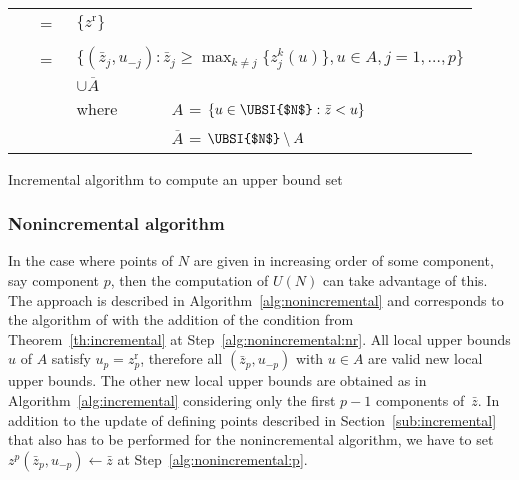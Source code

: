 \documentclass[a4paper,11pt]{article}
\newcommand{\bz}{\bar{z}}
\newcommand{\BM}{z^{\text{r}}}
\begin{document}
\begin{algorithm}
  \begin{tabular}{llll}
    \nl\UBSI{$\emptyset$}~      & =~ & \multicolumn{2}{l}{$\{\BM\}$\nllabel{alg:incremental:init}\;}\\
    &&&\\[-8pt]
    \nl\UBSI{$N\cup \{\bz\}$}~  & =~ & \multicolumn{2}{l}{$\{(\bz_j, u_{-j}) : \bz_j \geq \max_{k\neq j} \{z_j^{k}(u)\}, u\in A, j=1, \dots, p\}$\;}\nllabel{alg:incremental:nr}\\
    \nl                         &    &  $\cup \overline{A}$ &\;\\
    \nl                         &    & where~ & $A$ = $\{u\in \text{\UBSI{$N$}}: \bz<u\}$\nllabel{alg:incremental:A}\;\\
    \nl                         &    &        & $\overline{A}$ = $\text{\UBSI{$N$}}\setminus A$\;
  \end{tabular}
  \caption{Incremental algorithm to compute an upper bound set\label{alg:incremental}}
\end{algorithm}





\subsubsection{Nonincremental algorithm}\label{sub:nonincremental}

In the case where points of $N$ are given in increasing order of some component,
say component $p$, then the computation of $U(N)$ can take advantage of this.
The approach is described in Algorithm~\ref{alg:nonincremental} and corresponds to
the algorithm of \cite[Section 3.1]{KapRubShaVer08} 
with the addition of the condition from Theorem~\ref{th:incremental} at Step~\ref{alg:nonincremental:nr}.
All local upper bounds $u$ of $A$ satisfy $u_p=\BM_p$, 
therefore all $(\bz_p, u_{-p})$ with $u \in A$ are valid new local upper bounds. 
The other new local upper bounds are obtained as in Algorithm~\ref{alg:incremental}
considering only the first $p-1$ components of~$\bz$.
In addition to the update of defining points described in Section~\ref{sub:incremental}
that also has to be performed for the nonincremental algorithm, 
we have to set $z^p(\bz_p, u_{-p}) \leftarrow \bz$ at Step~\ref{alg:nonincremental:p}.
\end{document}
